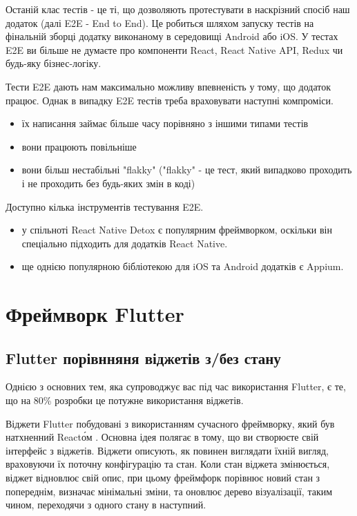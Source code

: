 Останій клас тестів - це ті, що дозволяють протестувати в наскрізний спосіб наш додаток (далі E2E - End to End).
Це робиться шляхом запуску тестів на фінальній зборці додатку виконаному в середовищі Android або iOS.
У тестах E2E ви більше не думаєте про компоненти React, React Native API, Redux чи будь-яку бізнес-логіку.

Тести E2E дають нам максимально можливу впевненість у тому, що додаток працює.
Однак в випадку E2E тестів треба враховувати наступні компроміси.

\begin{itemize}
    \item їх написання займає більше часу порівняно з іншими типами тестів
    \item вони працюють повільніше
    \item вони більш нестабільні "flakky" ("flakky"  - це тест, який випадково проходить і не проходить без будь-яких змін в коді)
\end{itemize}

Доступно кілька інструментів тестування E2E.
\begin{itemize}
    \item у спільноті React Native Detox є популярним фреймворком, оскільки він спеціально підходить для додатків React Native.\cite{detox_home_page}
    \item ще однією популярною бібліотекою для iOS та Android додатків є Appium.\cite{appium_home_page}
\end{itemize}


\section{Фреймворк Flutter}
\label{sec:flutter}

\subsection{Flutter порівнняня віджетів з/без стану}
\label{subsec:flutter_widgets_theory}
Однією з основних тем, яка супроводжує вас під час використання Flutter, є те, що на 80\% розробки це потужне використання віджетів.

Віджети Flutter побудовані з використанням сучасного фреймворку, який був натхненний React\'ом \cite{flutter_widgets_intro}.
Основна ідея полягає в тому, що ви створюєте свій інтерфейс з віджетів.
Віджети описують, як повинен виглядати їхній вигляд, враховуючи їх поточну конфігурацію та стан.
Коли стан віджета змінюється, віджет відновлює свій опис, при цьому фреймфорк порівнює новий стан з попереднім,
визначає мінімальні зміни, та оновлює дерево візуалізації, таким чином, переходячи з одного стану в наступний.

